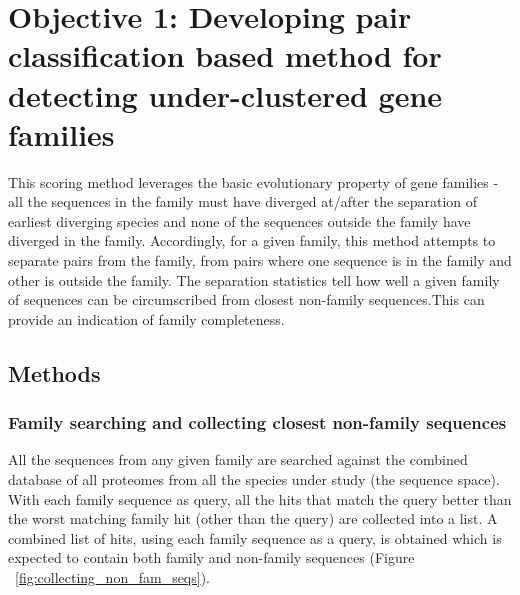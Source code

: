\documentclass{article}
\begin{document}
		\pagebreak

	\section{Objective 1: Developing pair classification based method for detecting under-clustered gene families} 
	This scoring method leverages the basic evolutionary property of gene families - all the sequences in the family must have diverged at/after the separation of earliest diverging species and none of the sequences outside the family have diverged in the family. Accordingly, for a given family, this method attempts to separate pairs from the family, from pairs where one sequence is in the family and other is outside the family. The separation statistics tell how well a given family of sequences can be circumscribed from closest non-family sequences.This can provide an indication of family completeness.
		\subsection{Methods}
			\subsubsection{Family searching and collecting closest non-family sequences}
			All the sequences from any given family are searched against the combined database of all proteomes from all the species under study (the sequence space). With each family sequence as query, all the hits that match the query better than the worst matching family hit (other than the query) are collected into a list. A combined list of hits, using each family sequence as a query, is obtained which is expected to contain both family and non-family sequences (Figure ~\ref{fig:collecting_non_fam_seqs}).
			
\end{document}

